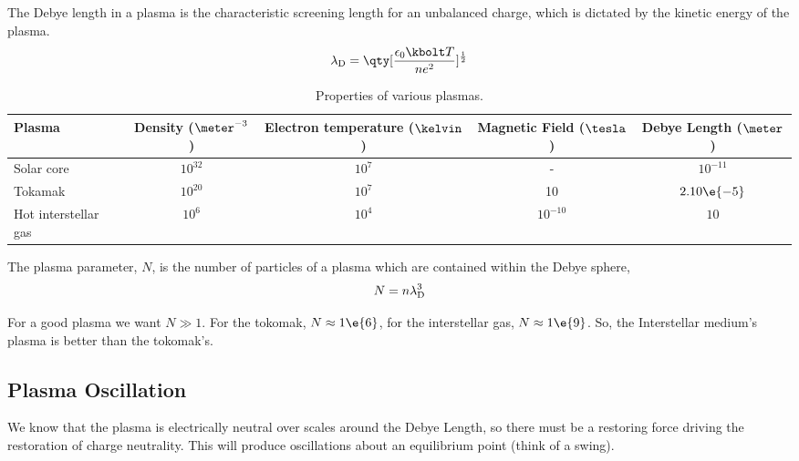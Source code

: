 \documentclass{book}         		                %
\begin{document}
\begin{definition}
  The Debye length in a plasma is the characteristic screening length
  for an unbalanced charge, which is dictated by the kinetic energy of
  the plasma.
  \[ \lambda_{\rm D} = \qty[ \frac{\epsilon_0 \kbolt T}{ne^2}]^{\frac{1}{2}} \]
\end{definition}

\begin{table*}
    \begin{tabular}{l|cccc}
      Plasma         & Density ($\meter^{-3}$) & Electron temperature ($\kelvin$) & Magnetic Field ($\tesla$) & Debye Length ($\meter$) \\\hline
      Solar core     & $10^{32}$               & $10^7$                           & -                         & $10^{-11}$              \\
      Tokamak        & $10^{20}$               & $10^7$                           & 10                        & $2.10 \e{-5}$           \\
Hot interstellar gas & $10^6$                  & $10^4$                           & $10^{-10}$                & $10$ \\ \hline
    \end{tabular}
\caption{Properties of various plasmas.}
\label{tab:prop-plas}
\end{table*}
  
\begin{definition}
  The plasma parameter, $N$, is the number of particles of a plasma
  which are contained within the Debye sphere,
  \[ N = n \lambda_{\rm D}^3 \]
\end{definition}
For a good plasma we want $N \gg 1$. For the tokomak, $N \approx
1\e{6}$, for the interstellar gas, $N \approx 1\e{9}$. So, the
Interstellar medium's plasma is better than the tokomak's.

\subsection{Plasma Oscillation}
\label{sec:plasmaosc}

We know that the plasma is electrically neutral over scales around the
Debye Length, so there must be a restoring force driving the
restoration of charge neutrality. This will produce oscillations about
an equilibrium point (think of a swing).
\end{document}
